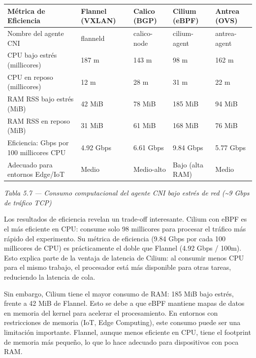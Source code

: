 \documentclass[journal]{IEEEtran}
\begin{document}
\begin{table}[htbp]
\centering
\scriptsize
\begin{tabularx}{\textwidth}{|Y|Y|Y|Y|Y|}
\hline
\textbf{Métrica de Eficiencia} & \textbf{Flannel (VXLAN)} & \textbf{Calico (BGP)} & \textbf{Cilium (eBPF)} & \textbf{Antrea (OVS)} \\
\hline
Nombre del agente CNI & flanneld & calico-node & cilium-agent & antrea-agent \\
CPU bajo estrés (millicores) & 187 m & 143 m & 98 m & 162 m \\
CPU en reposo (millicores) & 12 m & 28 m & 31 m & 22 m \\
RAM RSS bajo estrés (MiB) & 42 MiB & 78 MiB & 185 MiB & 94 MiB \\
RAM RSS en reposo (MiB) & 31 MiB & 61 MiB & 168 MiB & 76 MiB \\
Eficiencia: Gbps por 100 millicores CPU & 4.92 Gbps & 6.61 Gbps & 9.84 Gbps & 5.77 Gbps \\
Adecuado para entornos Edge/IoT & Medio & Medio-alto & Bajo (alta RAM) & Medio \\
\hline
\end{tabularx}
\end{table}

\begin{center}\emph{\emph{Tabla 5.7 --- Consumo computacional del agente CNI bajo estrés de red (\textasciitilde{}9 Gbps de tráfico TCP)}}\end{center}

Los resultados de eficiencia revelan un trade-off interesante. Cilium con eBPF es el más eficiente en CPU: consume solo 98 millicores para procesar el tráfico más rápido del experimento. Su métrica de eficiencia (9.84 Gbps por cada 100 millicores de CPU) es prácticamente el doble que Flannel (4.92 Gbps / 100m). Esto explica parte de la ventaja de latencia de Cilium: al consumir menos CPU para el mismo trabajo, el procesador está más disponible para otras tareas, reduciendo la latencia de cola.

Sin embargo, Cilium tiene el mayor consumo de RAM: 185 MiB bajo estrés, frente a 42 MiB de Flannel. Esto se debe a que eBPF mantiene mapas de datos en memoria del kernel para acelerar el procesamiento. En entornos con restricciones de memoria (IoT, Edge Computing), este consumo puede ser una limitación importante. Flannel, aunque menos eficiente en CPU, tiene el footprint de memoria más pequeño, lo que lo hace adecuado para dispositivos con poca RAM.
\end{document}
